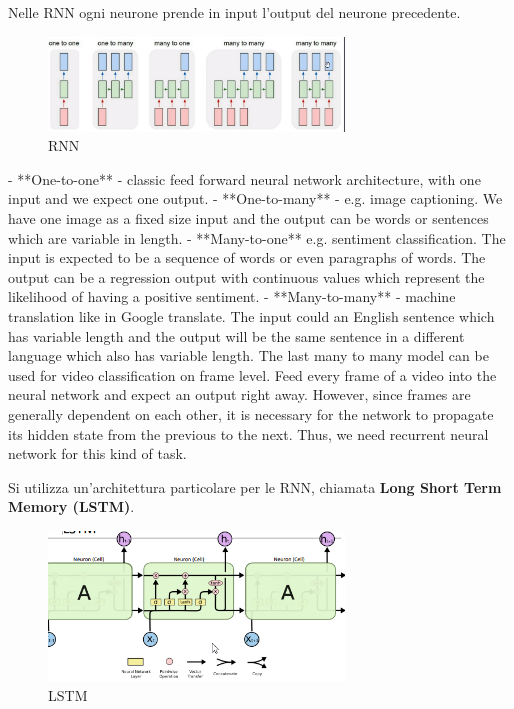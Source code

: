 Nelle RNN ogni neurone prende in input l'output del neurone precedente.
\begin{figure}[H]
    \centering
    \includegraphics[width=0.7\textwidth]{images/archRNN.png}
    \caption{RNN}
\end{figure}

- **One-to-one** - classic feed forward neural network architecture, with one input and we expect one output.
- **One-to-many** - e.g. image captioning. We have one image as a fixed size input and the output can be words or sentences which are variable in length.
- **Many-to-one** e.g. sentiment classification. The input is expected to be a sequence of words or even paragraphs of words. The output can be a regression output with continuous values which represent the likelihood of having a positive sentiment.
- **Many-to-many** - machine translation like in  Google translate. The input
could an English sentence which has variable length and the output will be the same sentence in a different language which also has variable length. The last many to many model can be used for video classification on frame level. Feed every frame of a video into the neural network and expect an output right away. However, since frames are generally dependent on each other, it is necessary for the network to propagate its hidden state from the previous to the next. Thus, we need recurrent neural network for this kind of task.

Si utilizza un'architettura particolare per le RNN, chiamata \textbf{Long Short Term Memory (LSTM)}.
\begin{figure}[H]
    \centering
    \includegraphics[width=0.7\textwidth]{images/LSTM.png}
    \caption{LSTM}
\end{figure}

